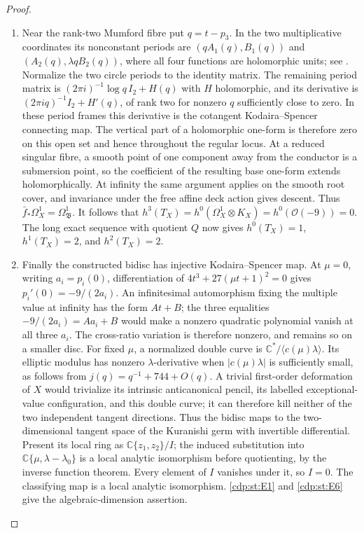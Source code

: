\begin{proof}
\begin{enumerate}[label=\arabic*.,leftmargin=*]
\item Near the rank-two Mumford fibre put $q=t-p_3$. In the two
multiplicative coordinates its nonconstant periods are
$(qA_1(q),B_1(q))$ and $(A_2(q),\lambda qB_2(q))$, where all four
functions are holomorphic units; see
\cite[Proposition labelled \texttt{mum}]{Viaclovsky2026Two}.
Normalize the two circle periods to the identity matrix. The remaining
period matrix is $(2\pi i)^{-1}\log q\,I_2+H(q)$ with $H$ holomorphic,
and its derivative is $(2\pi iq)^{-1}I_2+H'(q)$, of rank two for
nonzero $q$ sufficiently close to zero. In these period frames this
derivative is the cotangent Kodaira--Spencer connecting map.
The vertical part of a holomorphic one-form is therefore zero on
this open set and hence throughout the regular locus.
At a reduced singular fibre, a smooth point of one component away
from the conductor is a submersion point, so the coefficient of
the resulting base one-form extends holomorphically. At infinity
the same argument applies on the smooth root cover, and invariance
under the free affine deck action gives descent. Thus
$\bar f_*\Omega_X^1=\Omega_{\mathfrak B}^1$.
It follows that
$h^3(T_X)=h^0(\Omega_X^1\otimes K_X)
=h^0(\mathcal O(-9))=0$. The long exact sequence with quotient
$Q$ now gives $h^0(T_X)=1$, $h^1(T_X)=2$, and $h^2(T_X)=2$.

\item Finally the constructed bidisc has injective Kodaira--Spencer map.
At $\mu=0$, writing $a_i=p_i(0)$, differentiation of
$4t^3+27(\mu t+1)^2=0$ gives $p_i'(0)=-9/(2a_i)$.
An infinitesimal automorphism fixing the multiple value at infinity
has the form $At+B$; the three equalities
$-9/(2a_i)=Aa_i+B$ would make a nonzero quadratic polynomial vanish
at all three $a_i$. The cross-ratio variation is therefore nonzero,
and remains so on a smaller disc. For fixed $\mu$, a normalized
double curve is $\mathbb C^*/\langle c(\mu)\lambda\rangle$.
Its elliptic modulus has nonzero $\lambda$-derivative when
$|c(\mu)\lambda|$ is sufficiently small, as follows from
$j(q)=q^{-1}+744+O(q)$. A trivial first-order deformation of $X$
would trivialize its intrinsic anticanonical pencil, its labelled
exceptional-value configuration, and this double curve; it can
therefore kill neither of the two independent tangent directions.
Thus the bidisc maps to the two-dimensional tangent space of the
Kuranishi germ with invertible differential. Present its local
ring as $\mathbb C\{z_1,z_2\}/I$; the induced substitution into
$\mathbb C\{\mu,\lambda-\lambda_0\}$ is a local analytic
isomorphism before quotienting, by the inverse function theorem.
Every element of $I$ vanishes under it, so $I=0$. The classifying
map is a local analytic isomorphism. \ref{cdp:st:E1} and \ref{cdp:st:E6} give the algebraic-dimension assertion.

\end{enumerate}
\end{proof}